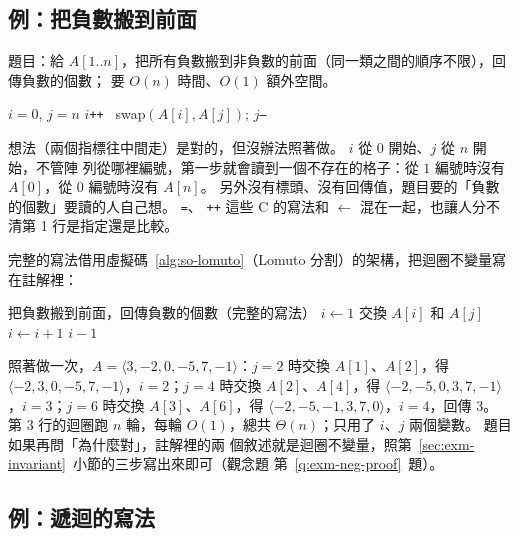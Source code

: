 \subsection{例：把負數搬到前面}

題目：給 $A[1..n]$，把所有負數搬到非負數的前面（同一類之間的順序不限），回傳負數的個數；
要 $O(n)$ 時間、$O(1)$ 額外空間。

\begin{exmbad}
\begin{algorithmic}[1]
\State $i = 0$, $j = n$
     $i$\texttt{++}
    \Else\ swap$(A[i], A[j])$; $j$\texttt{--}
    \EndIf
\EndWhile
\end{algorithmic}
\end{exmbad}

想法（兩個指標往中間走）是對的，但沒辦法照著做。 $i$ 從 $0$ 開始、$j$ 從 $n$ 開始，不管陣
列從哪裡編號，第一步就會讀到一個不存在的格子：從 $1$ 編號時沒有 $A[0]$，從 $0$ 編號時沒有
$A[n]$。 另外沒有標頭、沒有回傳值，題目要的「負數的個數」要讀的人自己想。 \texttt{=}、
\texttt{++} 這些 C 的寫法和 $\gets$ 混在一起，也讓人分不清第 1 行是指定還是比較。

完整的寫法借用虛擬碼~\ref{alg:so-lomuto}（Lomuto 分割）的架構，把迴圈不變量寫在註解裡：

\begin{pseudo}[label=alg:exm-neg]{把負數搬到前面，回傳負數的個數（完整的寫法）}
    \State $i \gets 1$ 
     
            \State 交換 $A[i]$ 和 $A[j]$
            \State $i \gets i + 1$
        \EndIf
    \EndFor
    \State \Return $i - 1$
\EndFunction
\end{pseudo}

照著做一次，$A = \langle 3, -2, 0, -5, 7, -1 \rangle$：$j = 2$ 時交換 $A[1]$、$A[2]$，得
$\langle -2, 3, 0, -5, 7, -1 \rangle$，$i = 2$；$j = 4$ 時交換 $A[2]$、$A[4]$，得
$\langle -2, -5, 0, 3, 7, -1 \rangle$，$i = 3$；$j = 6$ 時交換 $A[3]$、$A[6]$，得
$\langle -2, -5, -1, 3, 7, 0 \rangle$，$i = 4$，回傳 $3$。 第 3 行的迴圈跑 $n$ 輪，每輪
$O(1)$，總共 $\Theta(n)$；只用了 $i$、$j$ 兩個變數。 題目如果再問「為什麼對」，註解裡的兩
個敘述就是迴圈不變量，照第~\ref{sec:exm-invariant}~小節的三步寫出來即可（觀念題
第~\ref{q:exm-neg-proof}~題）。

\subsection{例：遞迴的寫法}

